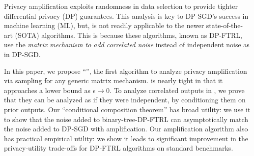 
Privacy amplification exploits randomness in data selection to provide tighter differential privacy (DP) guarantees. This analysis is key to DP-SGD's success in machine learning (ML), but, is not readily applicable to the newer state-of-the-art (SOTA) algorithms. This is because these algorithms, known as DP-FTRL, use the \emph{matrix mechanism to add correlated noise} instead of independent noise as in DP-SGD.

In this paper, we propose ``\MMCC{}'', the first algorithm to analyze privacy amplification via sampling for any generic matrix mechanism.
\MMCC{} is nearly tight in that it approaches a lower bound as $\epsilon\to0$. 
To analyze correlated outputs in \MMCC{}, we prove that they can be analyzed as if they were independent, by conditioning them on prior outputs. Our ``conditional composition theorem'' has broad utility: we use it to show that the noise added to binary-tree-DP-FTRL can asymptotically match the noise added to DP-SGD with amplification.
Our amplification algorithm also has practical empirical utility: we show it leads to significant improvement in the privacy-utility trade-offs for DP-FTRL algorithms on standard benchmarks.
